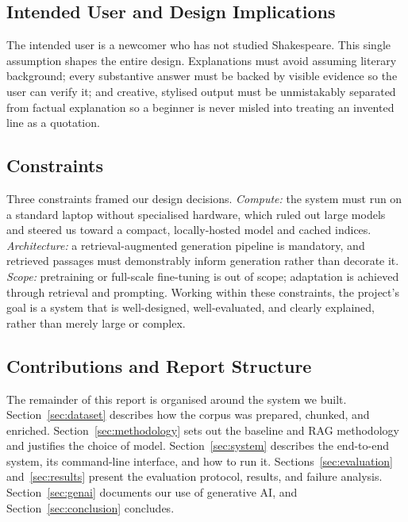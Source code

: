 \subsection{Intended User and Design Implications}
The intended user is a newcomer who has not studied Shakespeare. This
single assumption shapes the entire design. Explanations must avoid
assuming literary background; every substantive answer must be backed by
visible evidence so the user can verify it; and creative, stylised output
must be unmistakably separated from factual explanation so a beginner is
never misled into treating an invented line as a quotation.

\subsection{Constraints}
Three constraints framed our design decisions. \emph{Compute:} the system
must run on a standard laptop without specialised hardware, which ruled
out large models and steered us toward a compact, locally-hosted model
and cached indices. \emph{Architecture:} a retrieval-augmented generation
pipeline is mandatory, and retrieved passages must demonstrably inform
generation rather than decorate it. \emph{Scope:} pretraining or
full-scale fine-tuning is out of scope; adaptation is achieved through
retrieval and prompting. Working within these constraints, the project's
goal is a system that is well-designed, well-evaluated, and clearly
explained, rather than merely large or complex.

\subsection{Contributions and Report Structure}
The remainder of this report is organised around the system we built.
Section~\ref{sec:dataset} describes how the corpus was prepared, chunked,
and enriched. Section~\ref{sec:methodology} sets out the baseline and
RAG methodology and justifies the choice of model.
Section~\ref{sec:system} describes the end-to-end system, its command-line
interface, and how to run it. Sections~\ref{sec:evaluation}
and~\ref{sec:results} present the evaluation protocol, results, and
failure analysis. Section~\ref{sec:genai} documents our use of generative
AI, and Section~\ref{sec:conclusion} concludes.
